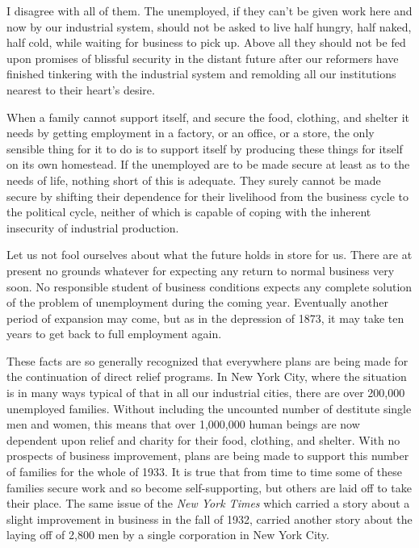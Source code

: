 \documentclass{book}
\begin{document}
I disagree with all of them. The unemployed, if they can’t be given work here and now by our industrial system, should not be asked to live half hungry, half naked, half cold, while waiting for business to pick up. Above all they should not be fed upon promises of blissful security in the distant future after our reformers have finished tinkering with the industrial system and remolding all our institutions nearest to their heart’s desire.

When a family cannot support itself, and secure the food, clothing, and shelter it needs by getting employment in a factory, or an office, or a store, the only sensible thing for it to do is to support itself by producing these things for itself on its own homestead. If the unemployed are to be made secure at least as to the needs of life, nothing short of this is adequate. They surely cannot be made secure by shifting their dependence for their livelihood from the business cycle to the political cycle, neither of which is capable of coping with the inherent insecurity of industrial production.

Let us not fool ourselves about what the future holds in store for us. There are at present no grounds whatever for expecting any return to normal business very soon. No responsible student of business conditions expects any complete solution of the problem of unemployment during the coming year. Eventually another period of expansion may come, but as in the depression of 1873, it may take ten years to get back to full employment again.

These facts are so generally recognized that everywhere plans are being made for the continuation of direct relief programs. In New York City, where the situation is in many ways typical of that in all our industrial cities, there are over 200,000 unemployed families. Without including the uncounted number of destitute single men and women, this means that over 1,000,000 human beings are now dependent upon relief and charity for their food, clothing, and shelter. With no prospects of business improvement, plans are being made to support this number of families for the whole of 1933. It is true that from time to time some of these families secure work and so become self-supporting, but others are laid off to take their place. The same issue of the \emph{New York Times} which carried a story about a slight improvement in business in the fall of 1932, carried another story about the laying off of 2,800 men by a single corporation in New York City.
\end{document}
